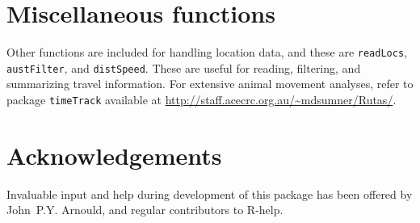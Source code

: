 \documentclass[12pt, letterpaper]{scrartcl}
\newcommand{\Rfunction}[1]{{\texttt{#1}}}
\newcommand{\Rpackage}[1]{{\texttt{#1}}}
\begin{document}
\section{Miscellaneous functions}
\label{sec:misc}

Other functions are included for handling location data, and these are
\Rfunction{readLocs}, \Rfunction{austFilter}, and \Rfunction{distSpeed}.
These are useful for reading, filtering, and summarizing travel
information.  For extensive animal movement analyses, refer to package
\Rpackage{timeTrack} available at
\url{http://staff.acecrc.org.au/~mdsumner/Rutas/}.


\section{Acknowledgements}
\label{sec:acknowledgements}

Invaluable input and help during development of this package has been
offered by John~P.Y. Arnould, and regular contributors to R-help.






\newpage{}

\end{document}
